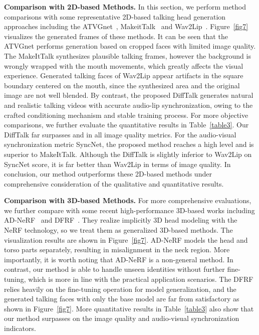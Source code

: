 \documentclass[10pt,twocolumn,letterpaper]{article}
\begin{document}
\textbf{Comparison with 2D-based Methods.} In this section, we perform method comparisons with some representative 2D-based talking head generation approaches including the ATVGnet~\cite{chen2019hierarchical}, MakeitTalk~\cite{zhou2020makelttalk} and Wav2Lip~\cite{prajwal2020lip}. Figure~\ref{fig7} visualizes the generated frames of these methods. It can be seen that the ATVGnet performs generation based on cropped faces with limited image quality. The MakeItTalk synthesizes plausible talking frames, however the background is wrongly wrapped with the mouth movements, which greatly affects the visual experience. Generated talking faces of Wav2Lip appear artifacts in the square boundary centered on the mouth, since the synthesized area and the original image are not well blended. By contrast, the proposed DiffTalk generates natural and realistic talking videos with accurate audio-lip synchronization, owing to the crafted conditioning mechanism and stable training process. For more objective comparisons, we further evaluate the quantitative results in Table~\ref{table3}. Our DiffTalk far surpasses \cite{prajwal2020lip} and \cite{zhou2020makelttalk} in all image quality metrics. For the audio-visual synchronization metric SyncNet, the proposed method reaches a high level and is superior to MakeItTalk. Although the DiffTalk is slightly inferior to Wav2Lip on SyncNet score, it is far better than Wav2Lip in terms of image quality. In conclusion, our method outperforms these 2D-based methods under comprehensive consideration of the qualitative and quantitative results.




\textbf{Comparison with 3D-based Methods.}  For more comprehensive
evaluations, we further compare with some recent high-performance 3D-based works including AD-NeRF~\cite{guo2021ad} and DFRF~\cite{shen2022dfrf}. They realize implicitly 3D head modeling with the NeRF technology, so we treat them as generalized 3D-based methods. The visualization results are shown in Figure~\ref{fig7}. AD-NeRF models the head and torso parts separately, resulting in misalignment in the neck region. More importantly, it is worth noting that AD-NeRF is a non-general method. In contrast, our method is able to handle unseen identities without further fine-tuning, which is more in line with the practical application scenarios. The DFRF relies heavily on the fine-tuning operation for model generalization, and the generated talking faces with only the base model are far from satisfactory as shown in Figure~\ref{fig7}. More quantitative results in Table~\ref{table3} also show that our method surpasses \cite{guo2021ad,shen2022dfrf} on the image quality and audio-visual synchronization indicators.
\end{document}
